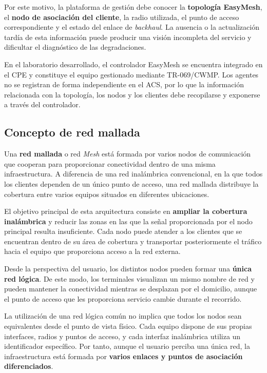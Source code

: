 Por este motivo, la plataforma de gestión debe conocer la
\textbf{topología EasyMesh}, el \textbf{nodo de asociación del cliente},
la radio utilizada, el punto de acceso correspondiente y el estado del
enlace de \textit{backhaul}. La ausencia o la actualización tardía de
esta información puede producir una visión incompleta del servicio y
dificultar el diagnóstico de las degradaciones.

En el laboratorio desarrollado, el controlador EasyMesh se encuentra
integrado en el CPE y constituye el equipo gestionado mediante
TR-069/CWMP. Los agentes no se registran de forma independiente en el
ACS, por lo que la información relacionada con la topología, los nodos y
los clientes debe recopilarse y exponerse a través del controlador.

\subsection{Concepto de red mallada}
\label{subsec:concepto-red-mallada}

Una \textbf{red mallada} o red \textit{Mesh} está formada por varios
nodos de comunicación que cooperan para proporcionar conectividad dentro
de una misma infraestructura. A diferencia de una red inalámbrica
convencional, en la que todos los clientes dependen de un único punto de
acceso, una red mallada distribuye la cobertura entre varios equipos
situados en diferentes ubicaciones.

El objetivo principal de esta arquitectura consiste en
\textbf{ampliar la cobertura inalámbrica} y reducir las zonas en las que
la señal proporcionada por el nodo principal resulta insuficiente. Cada
nodo puede atender a los clientes que se encuentran dentro de su área de
cobertura y transportar posteriormente el tráfico hacia el equipo que
proporciona acceso a la red externa.

Desde la perspectiva del usuario, los distintos nodos pueden formar una
\textbf{única red lógica}. De este modo, los terminales visualizan un
mismo nombre de red y pueden mantener la conectividad mientras se
desplazan por el domicilio, aunque el punto de acceso que les proporciona
servicio cambie durante el recorrido.

La utilización de una red lógica común no implica que todos los nodos
sean equivalentes desde el punto de vista físico. Cada equipo dispone de
sus propias interfaces, radios y puntos de acceso, y cada interfaz
inalámbrica utiliza un identificador específico. Por tanto, aunque el
usuario perciba una única red, la infraestructura está formada por
\textbf{varios enlaces y puntos de asociación diferenciados}.

